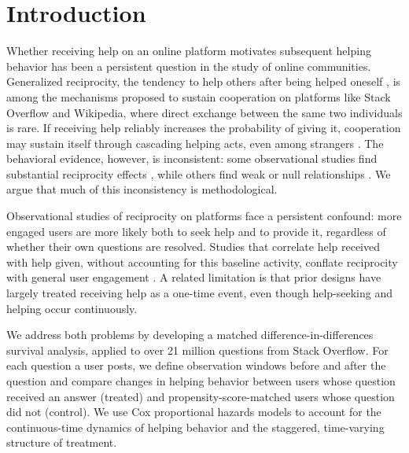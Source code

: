 \section{Introduction}

Whether receiving help on an online platform motivates subsequent helping behavior has been a persistent question in the study of online communities. Generalized reciprocity, the tendency to help others after being helped oneself \citep{nowak_upstream_2007, baker_paying_2014}, is among the mechanisms proposed to sustain cooperation on platforms like Stack Overflow and Wikipedia, where direct exchange between the same two individuals is rare. If receiving help reliably increases the probability of giving it, cooperation may sustain itself through cascading helping acts, even among strangers \citep{fowler_cooperative_2010}. The behavioral evidence, however, is inconsistent: some observational studies find substantial reciprocity effects \citep{baker_paying_2014, chen_why_2019}, while others find weak or null relationships \citep{wasko_why_2005, joyce_predicting_2006}. We argue that much of this inconsistency is methodological.

Observational studies of reciprocity on platforms face a persistent confound: more engaged users are more likely both to seek help and to provide it, regardless of whether their own questions are resolved. Studies that correlate help received with help given, without accounting for this baseline activity, conflate reciprocity with general user engagement \citep{baker_paying_2014, chen_engaging_2018, joyce_predicting_2006}. A related limitation is that prior designs have largely treated receiving help as a one-time event, even though help-seeking and helping occur continuously.

We address both problems by developing a matched difference-in-differences survival analysis, applied to over 21 million questions from Stack Overflow. For each question a user posts, we define observation windows before and after the question and compare changes in helping behavior between users whose question received an answer (treated) and propensity-score-matched users whose question did not (control). We use Cox proportional hazards models to account for the continuous-time dynamics of helping behavior and the staggered, time-varying structure of treatment.

